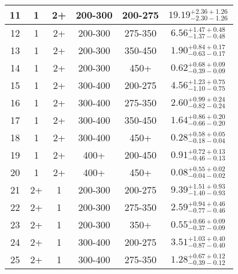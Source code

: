 \begin{table}[htbp]
\begin{centering}
\begin{lrbox}{\closureBox}
\begin{tabular}{|c|c|c|c|c||c|}
             11 &               1 &              2+ &         200-300 &         200-275 & $19.19^{+2.36 +1.26}_{-2.30 -1.26}$ \\
 \hline
             12 &               1 &              2+ &         200-300 &         275-350 & $6.56^{+1.47 +0.48}_{-1.37 -0.48}$ \\
 \hline
             13 &               1 &              2+ &         200-300 &         350-450 & $1.90^{+0.84 +0.17}_{-0.63 -0.17}$ \\
 \hline
             14 &               1 &              2+ &         200-300 &            450+ & $0.62^{+0.68 +0.09}_{-0.39 -0.09}$ \\
 \hline
             15 &               1 &              2+ &         300-400 &         200-275 & $4.56^{+1.23 +0.75}_{-1.10 -0.75}$ \\
 \hline
             16 &               1 &              2+ &         300-400 &         275-350 & $2.60^{+0.99 +0.24}_{-0.82 -0.24}$ \\
 \hline
             17 &               1 &              2+ &         300-400 &         350-450 & $1.64^{+0.86 +0.20}_{-0.66 -0.20}$ \\
 \hline
             18 &               1 &              2+ &         300-400 &            450+ & $0.28^{+0.58 +0.05}_{-0.18 -0.04}$ \\
 \hline
             19 &               1 &              2+ &            400+ &         200-450 & $0.91^{+0.72 +0.13}_{-0.46 -0.13}$ \\
 \hline
             20 &               1 &              2+ &            400+ &            450+ & $0.08^{+0.55 +0.02}_{-0.04 -0.02}$ \\
 \hline
             21 &              2+ &               1 &         200-300 &         200-275 & $9.39^{+1.51 +0.93}_{-1.40 -0.93}$ \\
 \hline
             22 &              2+ &               1 &         200-300 &         275-350 & $2.59^{+0.94 +0.46}_{-0.77 -0.46}$ \\
 \hline
             23 &              2+ &               1 &         200-300 &            350+ & $0.55^{+0.66 +0.09}_{-0.37 -0.09}$ \\
 \hline
             24 &              2+ &               1 &         300-400 &         200-275 & $3.51^{+1.03 +0.40}_{-0.87 -0.40}$ \\
 \hline
             25 &              2+ &               1 &         300-400 &         275-350 & $1.28^{+0.67 +0.12}_{-0.39 -0.12}$ \\

\end{tabular}
\end{lrbox}
\end{centering}
\end{table}
